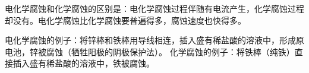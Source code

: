 \documentclass[UTF8, b5paper, 10pt]{article}
\begin{document}
	电化学腐蚀和化学腐蚀的区别是：电化学腐蚀过程伴随有电流产生，化学腐蚀过程却没有。电化学腐蚀比化学腐蚀要普遍得多，腐蚀速度也快得多。

	电化学腐蚀的例子：将锌棒和铁棒用导线相连，插入盛有稀盐酸的溶液中，形成原电池，锌被腐蚀（牺牲阳极的阴极保护法）。
	化学腐蚀的例子：将铁棒（纯铁）直接插入盛有稀盐酸的溶液中，铁被腐蚀。
\end{document}
